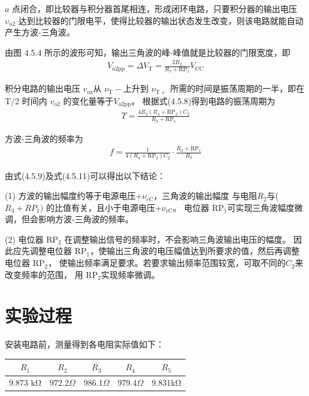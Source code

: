 \documentclass[a4paper,11pt,UTF8]{article}
\begin{document}
$a$ 点闭合，即比较器与积分器首尾相连，形成闭环电路，只要积分器的输出电压 $\upsilon_\mathrm{o2}$ 
达到比较器的门限电平，使得比较器的输出状态发生改变，则该电路就能自动产生方波-三角波。

由图 4.5.4 所示的波形可知，输出三角波的峰-峰值就是比较器的门限宽度，即
\begin{align}
	V_{\mathrm{o2pp}}=\Delta V_{\mathrm{T}}=\frac{2R_{2}}{R_{3}+\mathrm{RP}_{1}}V_{\mathrm{CC}}
\end{align}

积分电路的输出电压 $v_\mathrm{oz}$从 $\nu_\mathrm{T}-$上升到 $\nu_\mathrm{T+}$
所需的时间是振荡周期的一半，即在 T/2 时间内 $v_\mathrm{o2}$ 的变化量等于$V_\mathrm{o2pp}$。
根据式(4.5.8)得到电路的振荡周期为
\begin{align}
	T=\frac{4R_2(R_4+\mathrm{RP}_2)C_2}{R_3+\mathrm{RP}_1}
\end{align}

方波-三角波的频率为
\begin{align}
	f=\frac{1}{4(R_4+\mathrm{RP}_2)C_2}\cdot\frac{R_3+\mathrm{RP}_1}{R_2}
\end{align}

由式(4.5.9)及式(4.5.11)可以得出以下结论： 

(1) 方波的输出幅度约等于电源电压+$\nu_\mathrm{cC}$，三角波的输出幅度
与电阻$R_2$与($R_3+{RP}_1)$ 的比值有关，且小于电源电压+$\nu_\mathrm{\epsilon C}$。
电位器 RP$_{1}$可实现三角波幅度微调，但会影响方波-三角波的频率。

(2) 电位器 RP$_{2}$ 在调整输出信号的频率时，不会影响三角波输出电压的幅度。
因此应先调整电位器 RP$_1$，使输出三角波的电压幅值达到所要求的值，然后再调整电位器 RP$_2$，
使输出频率满足要求。若要求输出频率范围较宽，可取不同的$C_{2}$来改变频率的范围，
用 RP$_{2}$实现频率微调。

\section{实验过程}

安装电路前，测量得到各电阻实际值如下：

\begin{table}[H]
    \centering
    \begin{tabular}{|c|c|c|c|c|}
        \hline
        $R_1$ & $R_2$ & $R_3$ & $R_4$ & $R_5$ \\
        \hline
        9.873 $\mathrm{k\Omega}$ & 972.2$\Omega$ & 986.1$\Omega$ 
        & 979.4$\Omega$ & 9.831$\mathrm{k\Omega}$ \\
        \hline
    \end{tabular}
\end{table}
\end{document}
